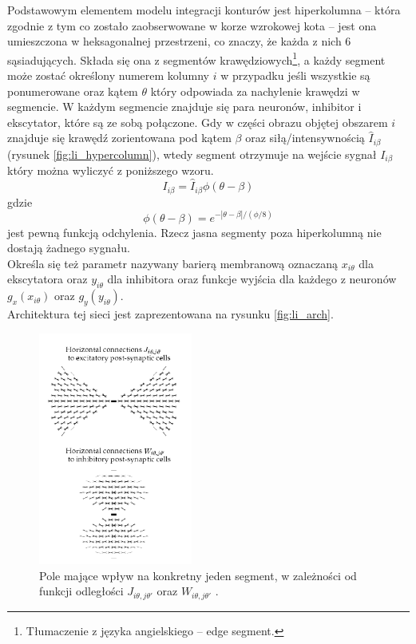 Podstawowym elementem modelu integracji konturów jest hiperkolumna -- która zgodnie z tym co zostało zaobserwowane w korze wzrokowej kota -- jest ona umieszczona w heksagonalnej przestrzeni, co znaczy, że każda z nich 6 sąsiadujących. Składa się ona z segmentów krawędziowych\footnote{Tłumaczenie z języka angielskiego -- edge segment.}, a każdy segment może zostać określony numerem kolumny $i$ w przypadku jeśli wszystkie są ponumerowane oraz kątem $\theta$ który odpowiada za nachylenie krawędzi w segmencie. W każdym segmencie znajduje się para neuronów, inhibitor i ekscytator, które są ze sobą połączone. Gdy w części obrazu objętej obszarem $i$ znajduje się krawędź zorientowana pod kątem $\beta$ oraz siłą/intensywnością $\hat{I}_{i\beta}$ (rysunek \ref{fig:li_hypercolumn}), wtedy segment otrzymuje na wejście sygnał $I_{i\beta}$ który można wyliczyć z poniższego wzoru. 
$$I_{i\beta} = \hat{I}_{i\beta} \phi (\theta - \beta)$$ 
gdzie 
$$\phi(\theta - \beta) = e^{-|\theta - \beta| / (\phi / 8 )}$$
jest pewną funkcją odchylenia. Rzecz jasna segmenty poza hiperkolumną nie dostają żadnego sygnału.\\
Określa się też parametr nazywany barierą membranową oznaczaną $x_{i\theta}$ dla ekscytatora oraz $y_{i\theta}$ dla inhibitora oraz funkcje wyjścia dla każdego z neuronów $g_x(x_{i\theta})$ oraz $g_y(y_{i\theta})$.\\
Architektura tej sieci jest zaprezentowana na rysunku \ref{fig:li_arch}.\\

\begin{figure}[ht]
	\centering
	\includegraphics[width=0.45\textwidth]{images/li_field.png}
	\caption{Pole mające wpływ na konkretny jeden segment, w zależności od funkcji odległości $J_{i\theta, j\theta'}$ oraz $W_{i\theta, j\theta'}$ \cite{Li1998}.}
	\label{fig:li_rf}
\end{figure}

